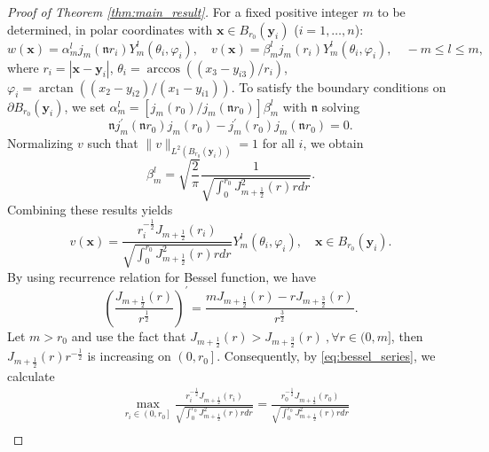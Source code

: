 \documentclass[11pt,reqno,oneside]{amsart}
\numberwithin{equation}{section}
\theoremstyle{definition}
\theoremstyle{remark}
\numberwithin{equation}{section}
\begin{document}
\begin{proof}[Proof of Theorem \ref{thm:main_result}]
		\medskip
		\item[\textbf{Case 1}: $d=3.$] For a fixed positive integer $m$ to be determined, in polar coordinates with $\mathbf{x} \in B_{r_0}(\mathbf{y}_i)$ ($i=1,\dots,n$):
		\begin{equation*}
			w(\mathbf{x}) = \alpha_{m}^{l} j_m( \mathfrak{n} r_i) Y_{m}^{l}(\theta_i, \varphi_i), \quad
			v(\mathbf{x}) = \beta_{m}^{l} j_m( r_i) Y_{m}^{l}(\theta_i, \varphi_i), \quad -m \leqslant l \leqslant m,
		\end{equation*}
		where $r_i = |\mathbf{x}-\mathbf{y}_i|$, $\theta_i = \arccos((x_3-y_{i3})/r_i)$, $\varphi_i = \arctan((x_2-y_{i2})/(x_1-y_{i1}))$. To satisfy the boundary conditions on $\partial B_{r_0}(\mathbf{y}_i)$, we set $\alpha^l_m = [j_m( r_0)/j_m( \mathfrak{n} r_0)] \beta^l_m$ with $\mathfrak{n}$ solving
		\begin{equation*}
			\mathfrak{n} j_{m}^\prime( \mathfrak{n} r_0) j_{m}( r_0) - j_{m}^\prime(r_0) j_{m}(\mathfrak{n} r_0) = 0.
		\end{equation*}
		Normalizing $v$ such that $\|v\|_{L^2(B_{r_0}(\mathbf{y}_i))} = 1$ for all $i$, we obtain
		\begin{equation*}
			\beta_m^l = \sqrt{\frac{2}{\pi}} \frac{1}{\sqrt{\int_0^{ r_0} J^2_{m+\frac{1}{2}}(r) r  dr}}.
		\end{equation*}
		Combining these results yields
		\begin{equation}\label{v in d=3}
			v(\mathbf{x}) = \frac{r_i^{-\frac{1}{2}} J_{m+\frac{1}{2}}( r_i)}{\sqrt{\int_0^{ r_0} J_{m+\frac{1}{2}}^2(r) r  dr}} Y_m^l(\theta_i, \varphi_i), \quad \mathbf{x} \in B_{r_0}(\mathbf{y}_i).
		\end{equation}
		By using recurrence relation for Bessel function, we have
		\begin{equation*}
			\left(\frac{J_{m+\frac{1}{2}}( r)}{r^{\frac{1}{2}}}\right)^{\prime}=\frac{m J_{m+\frac{1}{2}}( r)- r J_{m+\frac{3}{2}}( r) }{r^{\frac{3}{2}}}.
		\end{equation*}
		Let $m> r_0$ and use the fact that $J_{m+\frac{1}{2}}(r)>J_{m+\frac{3}{2}}(r)~ ,\forall r \in (0,m]$, then $J_{m+\frac{1}{2}}( r) r^{-\frac{1}{2}}$ is increasing on $\left(0, r_0\right]$. Consequently, by \eqref{eq:bessel_series}, we calculate
		\begin{equation}\label{max d=3}
			\begin{aligned}
				&\max _{r_i \in\left(0, r_0\right]}\frac{ {r_i^{-\frac{1}{2}}} J_{m+\frac{1}{2}}( r_i)}{\sqrt{\int_0^{ r_0} J_{m+\frac{1}{2}}^2(r) r d r}} =\frac{{r_0^{-\frac{1}{2}}} J_{m+\frac{1}{2}}( r_0)}{\sqrt{\int_0^{ r_0} J_{m+\frac{1}{2}}^2(r) r d r}}\\

\end{aligned}
\end{equation}
\end{proof}
\end{document}
